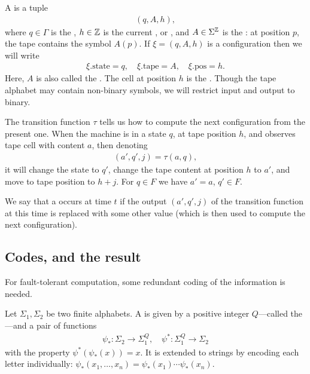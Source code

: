 \documentclass[12pt]{memoir}
\newcommand{\h}{h}
\newcommand{\pos}{\mathrm{pos}}
\newcommand{\Q}{Q}
\newcommand{\state}{\mathrm{state}}
\newcommand{\tape}{\mathrm{tape}}
\begin{document}
    A  is a tuple
        \begin{align*}
             (q,A,\h),
        \end{align*}
    where \( q\in\Gamma \) is the , 
\( \h\in\bbZ \) is the current , or ,
and \( A\in\Sigma^{\mathbb{Z}} \) is the : 
at position \( p \), the tape contains the symbol \( A(p) \).
If \( \xi=(q,A,\h) \) is a configuration then we will write
        \begin{align}\label{eq:config-1}
             \xi.\state=q, \quad \xi.\tape=A,\quad \xi.\pos=\h.
        \end{align}
    Here, \( A \) is also called the .
    The cell at position \( \h \) is the  .
Though the tape alphabet may contain
non-binary symbols, we will restrict input and output to binary.

    The transition function \( \tau \) tells us how to compute the next
    configuration from the present one.
    When the machine is in a state \( q \), at tape position \( \h \), and
    observes tape cell with content \( a \), then denoting
         \begin{align*}
           (a',q',j)=\tau(a,q),
         \end{align*}
    it will change the state to \( q' \), change the
    tape content at position \( \h \) to \( a' \), and move to tape position to \( \h+j \).
    For \( q\in F \) we have \( a'=a \), \( q'\in F \).


\begin{definition}[Fault]\label{def:fault}
    We say that a  occurs at time \( t \) if the output \( (a',q',j) \) of the
    transition function at this time is replaced with some other value
    (which is then used to compute the next configuration).
\end{definition}


\subsection{Codes, and the result}

For fault-tolerant computation, some redundant coding of the information is needed.

\begin{definition}[Codes]\label{def:codes}
    Let \( \Sigma_{1},\Sigma_{2} \) be two finite alphabets.
    A  is given by a positive integer \( \Q \)---called
    the ---and a pair of functions
    \begin{align*}
            \psi_{*} :\Sigma_{2}\to\Sigma_{1}^{\Q},
            \quad
            \psi^{*}:\Sigma_{1}^{\Q}\to\Sigma_{2}
    \end{align*}
    with the property \( \psi^{*}(\psi_{*}(x))=x \).
It is extended to strings by encoding each letter individually:
\( \psi_{*}(x_{1},\dots,x_{n})=\psi_{*}(x_{1})\dotsm\psi_{*}(x_{n}) \).
\end{definition}
\end{document}
